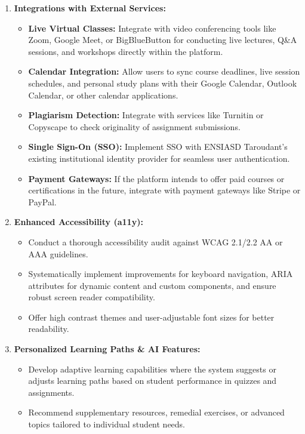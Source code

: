 \begin{enumerate}
\begin{itemize}
    \end{itemize}
    \item \textbf{Integrations with External Services:}
    \begin{itemize}
        \item \textbf{Live Virtual Classes:} Integrate with video conferencing tools like Zoom, Google Meet, or BigBlueButton for conducting live lectures, Q\&A sessions, and workshops directly within the platform.
        \item \textbf{Calendar Integration:} Allow users to sync course deadlines, live session schedules, and personal study plans with their Google Calendar, Outlook Calendar, or other calendar applications.
        \item \textbf{Plagiarism Detection:} Integrate with services like Turnitin or Copyscape to check originality of assignment submissions.
        \item \textbf{Single Sign-On (SSO):} Implement SSO with ENSIASD Taroudant's existing institutional identity provider for seamless user authentication.
        \item \textbf{Payment Gateways:} If the platform intends to offer paid courses or certifications in the future, integrate with payment gateways like Stripe or PayPal.
    \end{itemize}
    \item \textbf{Enhanced Accessibility (a11y):}
    \begin{itemize}
        \item Conduct a thorough accessibility audit against WCAG 2.1/2.2 AA or AAA guidelines.
        \item Systematically implement improvements for keyboard navigation, ARIA attributes for dynamic content and custom components, and ensure robust screen reader compatibility.
        \item Offer high contrast themes and user-adjustable font sizes for better readability.
    \end{itemize}
    \item \textbf{Personalized Learning Paths \& AI Features:}
    \begin{itemize}
        \item Develop adaptive learning capabilities where the system suggests or adjusts learning paths based on student performance in quizzes and assignments.
        \item Recommend supplementary resources, remedial exercises, or advanced topics tailored to individual student needs.

\end{itemize}
\end{enumerate}
